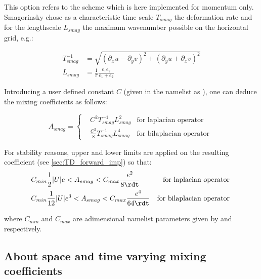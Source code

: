 \documentclass[../main/NEMO_manual]{subfiles}
\begin{document}
This option refers to the \citep{smagorinsky_MWR63} scheme which is here implemented for momentum only. Smagorinsky chose as a
characteristic time scale $T_{smag}$ the deformation rate and for the lengthscale $L_{smag}$ the maximum wavenumber possible on the horizontal grid, e.g.:

\begin{equation}
  \label{eq:LDF_smag1}
  \begin{split}
    T_{smag}^{-1} & = \sqrt{\left( \partial_x u - \partial_y v\right)^2 + \left( \partial_y u + \partial_x v\right)^2  } \\
    L_{smag} & = \frac{1}{\pi}\frac{e_1 e_2}{e_1 + e_2}
  \end{split}
\end{equation}

Introducing a user defined constant $C$ (given in the namelist as ), one can deduce the mixing coefficients as follows:

\begin{equation}
  \label{eq:LDF_smag2}
  A_{smag} = \left\{
    \begin{aligned}
      & C^2  T_{smag}^{-1}  L_{smag}^2			& \text{for laplacian operator } \\
      & \frac{C^2}{8} T_{smag}^{-1} L_{smag}^4     	& \text{for bilaplacian operator }
    \end{aligned}
  \right.
\end{equation}

For stability reasons, upper and lower limits are applied on the resulting coefficient (see \autoref{sec:TD_forward_imp}) so that:
\begin{equation}
  \label{eq:LDF_smag3}
    \begin{aligned}
      & C_{min} \frac{1}{2}   \lvert U \rvert  e    < A_{smag} < C_{max} \frac{e^2}{   8\rdt}                 & \text{for laplacian operator } \\
      & C_{min} \frac{1}{12} \lvert U \rvert  e^3 < A_{smag} < C_{max} \frac{e^4}{64 \rdt}                 & \text{for bilaplacian operator }
    \end{aligned}
\end{equation}

where $C_{min}$ and $C_{max}$ are adimensional namelist parameters given by  and  respectively.

\subsection{About space and time varying mixing coefficients}
\end{document}
